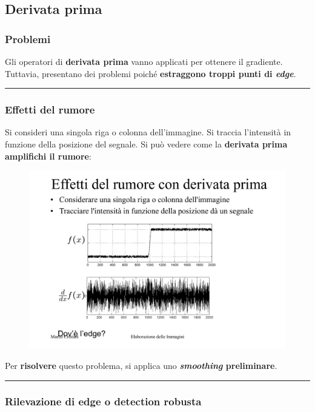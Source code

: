 \documentclass[a4paper]{article}
\newcommand{\longline}{\noindent\rule{\textwidth}{0.4pt}}
\begin{document}
	\subsection{Derivata prima}
	
	\subsubsection{Problemi}
	
	Gli operatori di \textbf{derivata prima} vanno applicati per ottenere il gradiente. Tuttavia, presentano dei problemi poiché \textbf{estraggono troppi punti di \emph{edge}}.
	
	\longline
	
	\subsubsection{Effetti del rumore}
	
	Si consideri una singola riga o colonna dell'immagine. Si traccia l'intensità in funzione della posizione del segnale. Si può vedere come la \textbf{derivata prima amplifichi il rumore}:
	\begin{figure}[!htp]
		\centering
		\includegraphics[width=.8\textwidth]{img/derivata_prima.pdf}
	\end{figure}

	\noindent
	Per \textbf{risolvere} questo problema, si applica uno \textbf{\emph{smoothing} preliminare}.

	\longline
	
	\subsubsection{Rilevazione di edge o detection robusta}
	
\end{document}
